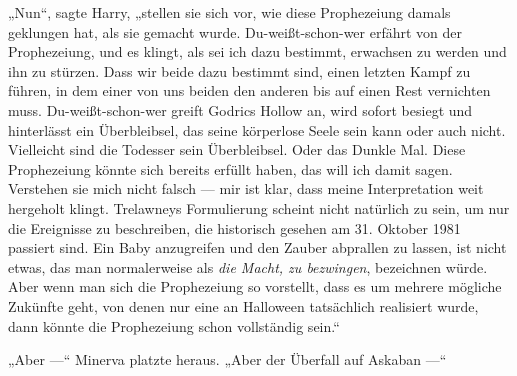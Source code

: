 „Nun“, sagte Harry, „stellen sie sich vor, wie diese Prophezeiung damals geklungen hat, als sie gemacht wurde. Du-weißt-schon-wer erfährt von der Prophezeiung, und es klingt, als sei ich dazu bestimmt, erwachsen zu werden und ihn zu stürzen. Dass wir beide dazu bestimmt sind, einen letzten Kampf zu führen, in dem einer von uns beiden den anderen bis auf einen Rest vernichten muss. Du-weißt-schon-wer greift Godrics Hollow an, wird sofort besiegt und hinterlässt ein Überbleibsel, das seine körperlose Seele sein kann oder auch nicht. Vielleicht sind die Todesser sein Überbleibsel. Oder das Dunkle Mal. Diese Prophezeiung könnte sich bereits erfüllt haben, das will ich damit sagen. Verstehen sie mich nicht falsch — mir ist klar, dass meine Interpretation weit hergeholt klingt. Trelawneys Formulierung scheint nicht natürlich zu sein, um nur die Ereignisse zu beschreiben, die historisch gesehen am 31. Oktober 1981 passiert sind. Ein Baby anzugreifen und den Zauber abprallen zu lassen, ist nicht etwas, das man normalerweise als \emph{die Macht, zu bezwingen}, bezeichnen würde. Aber wenn man sich die Prophezeiung so vorstellt, dass es um mehrere mögliche Zukünfte geht, von denen nur eine an Halloween tatsächlich realisiert wurde, dann könnte die Prophezeiung schon vollständig sein.“

„Aber —“ Minerva platzte heraus.
„Aber der Überfall auf Askaban —“

